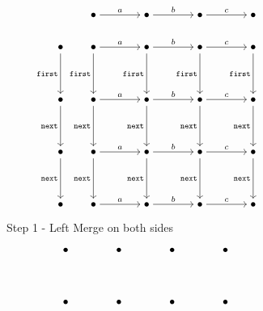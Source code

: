 \begin{figure}[!ht]
   \centering

   \begin{subfigure}[b]{0.4\textwidth}
      \[\begin{tikzcd}[cramped, column sep=scriptsize]
& \bullet && \bullet && \bullet && \bullet \\
	 \bullet & \bullet && \bullet && \bullet && \bullet \\
	 \\
	 \bullet & \bullet && \bullet && \bullet && \bullet \\
	 \\
	 \bullet & \bullet && \bullet && \bullet && \bullet \\
	 \\
	 \bullet & \bullet && \bullet && \bullet && \bullet
	 \arrow["a", from=1-2, to=1-4]
	 \arrow["b", from=1-4, to=1-6]
	 \arrow["c", from=1-6, to=1-8]
	 \arrow["{\mathtt{first}}"', from=2-1, to=4-1]
	 \arrow["a", from=2-2, to=2-4]
	 \arrow["{\mathtt{first}}"', from=2-2, to=4-2]
	 \arrow["b", from=2-4, to=2-6]
	 \arrow["{\mathtt{first}}"', from=2-4, to=4-4]
	 \arrow["c", from=2-6, to=2-8]
	 \arrow["{\mathtt{first}}"', from=2-6, to=4-6]
	 \arrow["{\mathtt{first}}"', from=2-8, to=4-8]
	 \arrow["{\mathtt{next}}"', from=4-1, to=6-1]
	 \arrow["a", from=4-2, to=4-4]
	 \arrow["{\mathtt{next}}"', from=4-2, to=6-2]
	 \arrow["b", from=4-4, to=4-6]
	 \arrow["{\mathtt{next}}"', from=4-4, to=6-4]
	 \arrow["c", from=4-6, to=4-8]
	 \arrow["{\mathtt{next}}"', from=4-6, to=6-6]
	 \arrow["{\mathtt{next}}"', from=4-8, to=6-8]
	 \arrow["{\mathtt{next}}"', from=6-1, to=8-1]
	 \arrow["a", from=6-2, to=6-4]
	 \arrow["{\mathtt{next}}"', from=6-2, to=8-2]
	 \arrow["b", from=6-4, to=6-6]
	 \arrow["{\mathtt{next}}"', from=6-4, to=8-4]
	 \arrow["c", from=6-6, to=6-8]
	 \arrow["{\mathtt{next}}"', from=6-6, to=8-6]
	 \arrow["{\mathtt{next}}"', from=6-8, to=8-8]
	 \arrow["a", from=8-2, to=8-4]
	 \arrow["b", from=8-4, to=8-6]
	 \arrow["c", from=8-6, to=8-8]
      \end{tikzcd}\]
      \caption{Step 1 - Left Merge on both sides}
   \end{subfigure}
   \hfill
   \begin{subfigure}[b]{0.4\textwidth}
      \[\begin{tikzcd}[cramped, column sep=scriptsize]
	 \bullet && \bullet && \bullet && \bullet \\
	 \\
	 \bullet && \bullet && \bullet && \bullet \\

\end{tikzcd}\]
\end{subfigure}
\end{figure}
